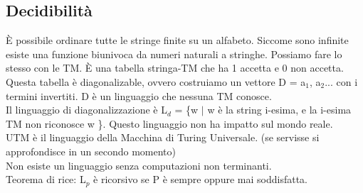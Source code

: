 \documentclass[12pt]{article}
\begin{document}
\subsection{Decidibilità}
È possibile ordinare tutte le stringe finite su un alfabeto.
Siccome sono infinite esiste una funzione biunivoca da numeri naturali a stringhe. 
Possiamo fare lo stesso con le TM. È una tabella stringa-TM che ha 1 accetta e 0 non accetta.
\\ Questa tabella è diagonalizable, ovvero costruiamo un vettore D = a$_1$, a$_2$... con i termini invertiti. D è un linguaggio che nessuna TM conosce. 
\\ Il linguaggio di diagonalizzazione è L$_d$ = \{w $|$ w è la string i-esima, e la i-esima TM non riconosce w \}. Questo linguaggio non ha impatto sul mondo reale.
\\ UTM è il linguaggio della Macchina di Turing Universale. (se servisse si approfondisce in un secondo momento)\\ Non esiste un linguaggio senza computazioni non terminanti.
\\ Teorema di rice: L$_p$ è ricorsivo se P è sempre oppure mai soddisfatta.
\end{document}
